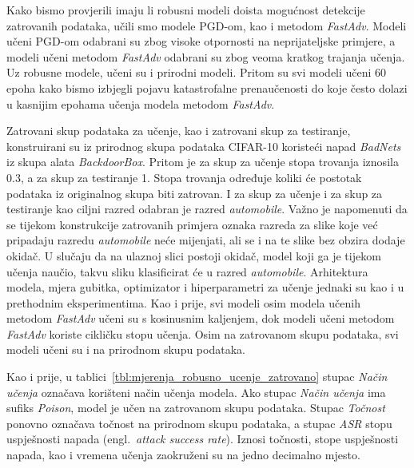\documentclass[times, utf8, zavrsni, numeric]{fer}
\begin{document}
Kako bismo provjerili imaju li robusni modeli doista mogućnost detekcije zatrovanih podataka,
učili smo modele PGD-om, kao i metodom \textit{FastAdv}. Modeli učeni PGD-om odabrani su zbog visoke otpornosti na neprijateljske primjere,
a modeli učeni metodom \textit{FastAdv} odabrani su zbog veoma kratkog trajanja učenja. Uz robusne modele, učeni su i prirodni modeli.
Pritom su svi modeli učeni 60 epoha kako bismo izbjegli pojavu katastrofalne prenaučenosti do koje često dolazi u kasnijim epohama učenja modela metodom \textit{FastAdv}. 

Zatrovani skup podataka za učenje, kao i zatrovani skup za testiranje, konstruirani su iz prirodnog skupa podataka CIFAR-10 koristeći napad \textit{BadNets} iz skupa alata \textit{BackdoorBox}. 
Pritom je za skup za učenje stopa trovanja iznosila 0.3, a za skup za testiranje 1. Stopa trovanja određuje koliki će postotak podataka iz originalnog skupa biti zatrovan.
I za skup za učenje i za skup za testiranje kao ciljni razred odabran je razred \textit{automobile}. 
Važno je napomenuti da se tijekom konstrukcije zatrovanih primjera oznaka razreda za slike koje već pripadaju razredu \textit{automobile} neće mijenjati, ali se i na te slike bez obzira dodaje okidač.
U slučaju da na ulaznoj slici postoji okidač, model koji ga je tijekom učenja naučio, takvu sliku klasificirat će u razred \textit{automobile}.
Arhitektura modela, mjera gubitka, optimizator i hiperparametri za učenje jednaki su kao i u prethodnim eksperimentima. 
Kao i prije, svi modeli osim modela učenih metodom \textit{FastAdv} učeni su s kosinusnim kaljenjem, dok modeli učeni metodom \textit{FastAdv} koriste cikličku stopu učenja.
Osim na zatrovanom skupu podataka, svi modeli učeni su i na prirodnom skupu podataka.

Kao i prije, u tablici~\ref{tbl:mjerenja_robusno_ucenje_zatrovano} stupac \textit{Način učenja} označava korišteni način učenja modela. 
Ako stupac \textit{Način učenja} ima sufiks \textit{Poison}, model je učen na zatrovanom skupu podataka.
Stupac \textit{Točnost} ponovno označava točnost na prirodnom skupu podataka, a stupac \textit{ASR}
stopu uspješnosti napada (engl.\ \textit{attack success rate}). Iznosi točnosti, stope uspješnosti napada, kao i vremena učenja zaokruženi su na jedno decimalno mjesto.
\end{document}
